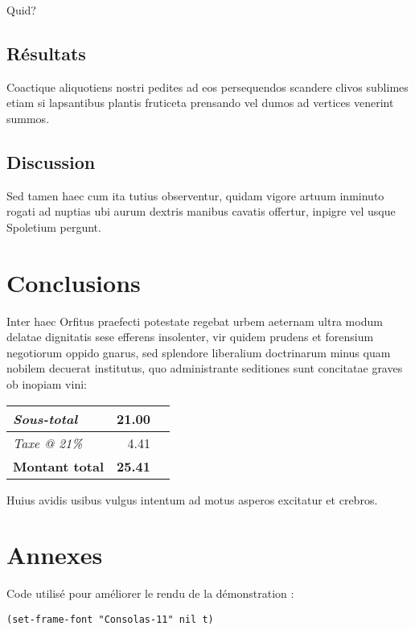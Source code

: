 \documentclass[french]{report}
\begin{document}
Quid?

\section{Résultats}
\label{sec:org45d157b}

Coactique aliquotiens nostri pedites ad eos persequendos scandere clivos
sublimes etiam si lapsantibus plantis fruticeta prensando vel dumos ad vertices
venerint summos.

\section{Discussion}
\label{sec:org7c64c77}

Sed tamen haec cum ita tutius observentur, quidam vigore artuum inminuto rogati
ad nuptias ubi aurum dextris manibus cavatis offertur, inpigre vel usque
Spoletium pergunt.

\chapter{Conclusions}
\label{sec:org7776d8a}

Inter haec Orfitus praefecti potestate regebat urbem aeternam ultra modum
delatae dignitatis sese efferens insolenter, vir quidem prudens et forensium
negotiorum oppido gnarus, sed splendore liberalium doctrinarum minus quam
nobilem decuerat institutus, quo administrante seditiones sunt concitatae graves
ob inopiam vini:

\begin{center}
\begin{tabular}{lrl}
\emph{Sous-total} & 21.00 & \texteuro{}\\
\hline
\emph{Taxe @ 21\%} & 4.41 & \texteuro{}\\
\hline
\textbf{Montant total} & \textbf{\large{25.41}} & \textbf{\texteuro{}}\\
\end{tabular}
\end{center}

Huius avidis usibus vulgus intentum ad motus asperos excitatur et crebros.

\chapter{Annexes}
\label{sec:orga31b3e4}

Code utilisé pour améliorer le rendu de la démonstration :

\lstset{language=Lisp,label= ,caption= ,captionpos=b,numbers=none}
\begin{lstlisting}
(set-frame-font "Consolas-11" nil t)
\end{lstlisting}
\end{document}
